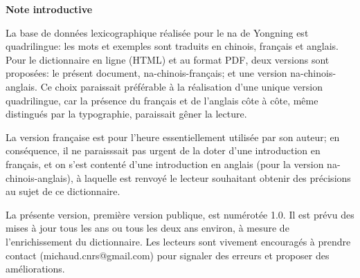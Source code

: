 	{\LARGE \textbf{Note introductive}}
	
La base de données lexicographique réalisée pour le na de Yongning est quadrilingue: les mots et exemples sont traduits en chinois, français et anglais. Pour le dictionnaire en ligne (HTML) et au format PDF, deux versions sont proposées: le présent document, na-chinois-français; et une version na-chinois-anglais. Ce choix paraissait préférable à la réalisation d'une unique version quadrilingue, car la présence du français et de l'anglais côte à côte, même distingués par la typographie, paraissait gêner la lecture.

La version française est pour l'heure essentiellement utilisée par son auteur; en conséquence, il ne paraisssait pas urgent de la doter d'une introduction en français, et on s'est contenté d'une introduction en anglais (pour la version na-chinois-anglais), à laquelle est renvoyé le lecteur souhaitant obtenir des précisions au sujet de ce dictionnaire. 

La présente version, première version publique, est numérotée 1.0. Il est prévu des mises à jour tous les ans ou tous les deux ans environ, à mesure de l'enrichissement du dictionnaire. Les lecteurs sont vivement encouragés à prendre contact (michaud.cnrs@gmail.com) pour signaler des erreurs et proposer des améliorations.


